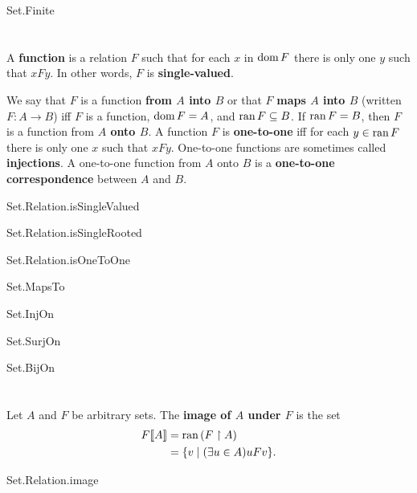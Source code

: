 \documentclass{report}
\begin{document}
    {Set.Finite}

\section{}%

  A \textbf{function} is a relation $F$ such that for each $x$ in $\mathop{\text{dom}}{F}$
    there is only one $y$ such that $xFy$.
  In other words, $F$ is \textbf{single-valued}.

  We say that $F$ is a function \textbf{from $A$ into $B$} or that $F$
    \textbf{maps $A$ into $B$} (written $F \colon A \rightarrow B$) iff $F$ is a
    function, $\mathop{\text{dom}}{F} = A$, and $\mathop{\text{ran}}{F} \subseteq B$.
  If $\mathop{\text{ran}}{F} = B$, then $F$ is a function from \textbf{$A$ onto $B$}.
  A function $F$ is \textbf{one-to-one} iff for each $y \in \mathop{\text{ran}}{F}$ there is
    only one $x$ such that $xFy$.
  One-to-one functions are sometimes called \textbf{injections}.
  A one-to-one function from $A$ onto $B$ is a
    \textbf{one-to-one correspondence} between $A$ and $B$.

    {Set.Relation.isSingleValued}

    {Set.Relation.isSingleRooted}

    {Set.Relation.isOneToOne}

    {Set.MapsTo}

    {Set.InjOn}

    {Set.SurjOn}

    {Set.BijOn}

\section{}%

  Let $A$ and $F$ be arbitrary sets.
  The \textbf{image of $A$ under $F$} is the set
    \begin{align*}
      F\!\left\llbracket A\right\rrbracket
        & = \mathop{\text{ran}}{(F \restriction A)} \\
        & = \{v \mid (\exists u \in A) uFv\}.
    \end{align*}

    {Set.Relation.image}
\end{document}
